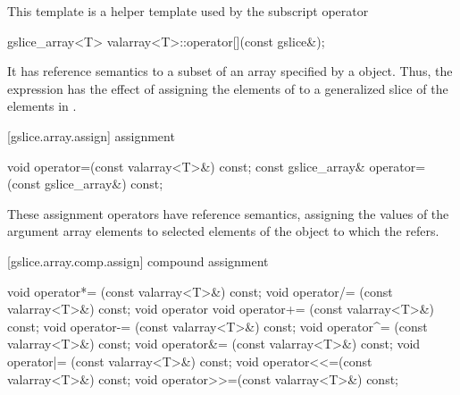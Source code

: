 \pnum
This template is a helper template used by the
subscript operator

%
%
\begin{itemdecl}
gslice_array<T> valarray<T>::operator[](const gslice&);
\end{itemdecl}

\pnum
It has reference semantics to a subset of an array specified by a
object.
Thus, the expression
has the effect of assigning the elements of
to a
generalized slice of the elements in
.

[gslice.array.assign]{ assignment}

%
\begin{itemdecl}
void operator=(const valarray<T>&) const;
const gslice_array& operator=(const gslice_array&) const;
\end{itemdecl}

\begin{itemdescr}
\pnum
These assignment operators have reference semantics, assigning the values
of the argument array elements to selected elements of the
object to which the
refers.
\end{itemdescr}

[gslice.array.comp.assign]{ compound assignment}

%
%
%
%
%
%
%
%
%
%
\begin{itemdecl}
void operator*= (const valarray<T>&) const;
void operator/= (const valarray<T>&) const;
void operator%
void operator+= (const valarray<T>&) const;
void operator-= (const valarray<T>&) const;
void operator^= (const valarray<T>&) const;
void operator&= (const valarray<T>&) const;
void operator|= (const valarray<T>&) const;
void operator<<=(const valarray<T>&) const;
void operator>>=(const valarray<T>&) const;
\end{itemdecl}

